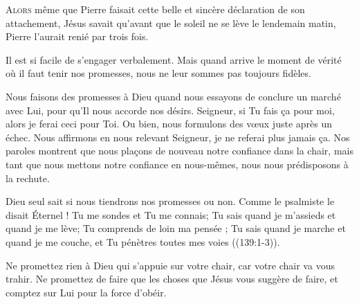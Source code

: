 \dvrule








\lettrine{A}{lors} même que Pierre faisait cette belle
 et sincère déclaration de son attachement,
 Jésus savait qu'avant que le soleil ne se lève le lendemain matin,
 Pierre l'aurait renié par trois fois.

Il est si facile de s'engager verbalement.
 Mais quand arrive le moment de vérité où il faut tenir nos promesses,
 nous ne leur sommes pas toujours fidèles.


Nous faisons des promesses à Dieu quand nous essayons de conclure
 un marché avec Lui, pour qu'Il nous accorde nos désirs.
 \Og Seigneur, si Tu fais \c{c}a pour moi, alors je ferai  ceci pour Toi. \Fg{}
 Ou bien,  nous formulons des v\oe{}ux juste après un échec.
 Nous affirmons en nous relevant\frcolon{} 
 \Og Seigneur, je ne referai plus jamais \c{c}a. \Fg{}
 Nos paroles montrent que nous pla\c{c}ons de nouveau notre confiance
 dans la chair, mais tant que nous mettons notre confiance en nous-mêmes,
 nous nous prédisposons à la rechute.

Dieu seul sait si nous tiendrons nos promesses ou non.
 Comme le psalmiste le disait\frcolon{} 
 \Og Éternel ! Tu me sondes et Tu me connais; Tu sais quand je m'assieds
 et quand je me lève; Tu comprends de loin ma pensée ;
 Tu sais quand je marche et quand je me couche,
 et Tu pénètres toutes mes voies \Fg{} ((139:1-3)).

Ne promettez rien à Dieu qui s'appuie sur votre chair,
 car votre chair va vous trahir.
 Ne promettez de faire que les choses que Jésus vous suggère de faire,
 et comptez sur Lui pour la force d'obéir.

